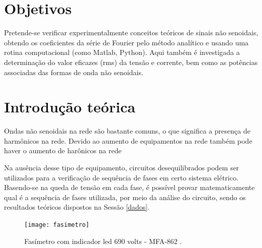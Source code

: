 \documentclass[a4paper,12pt,oneside,openany,table,xcdraw]{article}
\begin{document}
\newcommand{\thedepartment}{Faculdade de Engenharia Elétrica}
\newcommand{\thecourse}{FEELT}
\newcommand{\thetitle}{ANÁLISE DE ONDAS NÃO SENOIDAIS - LÂMPADAS (CARGAS NÃO LINEARES)}
\newcommand{\thetype}{Relatório da Disciplina de Experimental de Circuitos Elétricos II}
\newcommand{\theproftitle}{Bacharel em Engenharia Elétrica}
\newcommand{\thestudent}{Lesly Viviane Montúfar Berrios\\
\centering11811ETE001}
\newcommand{\theadvisor}{Prof. Wellington Maycon Santos Bernardes}
\newcommand{\thecity}{Uberlândia}

\thispagestyle{empty}


\onehalfspacing
\tableofcontents %
\newpage

\section{Objetivos} %
Pretende-se verificar experimentalmente conceitos teóricos de sinais não senoidais, obtendo os coeficientes da série de Fourier pelo método analítico e usando uma rotina computacional (como Matlab, Python). Aqui também é investigada a determinação do valor eficazes (rms) da tensão e corrente, bem como as potências associadas das formas de onda não senoidais.

\section{Introdução teórica} %

Ondas não senoidais na rede são bastante comuns, o que significa a presença de harmônicos na rede. Devido ao aumento de equipamentos na rede também pode haver o aumento de harônicos na rede

Na ausência desse tipo de equipamento, circuitos desequilibrados podem ser utilizados para a verificação de sequência de fases em certo sistema elétrico. Basendo-se na queda de tensão em cada fase, é possível provar matematicamente qual é a sequência de fases utilizada, por meio da análise do circuito, sendo os resultados teóricos dispostos na Sessão \ref{dados}.

\vspace{0.5cm}
\begin{figure}[H]
\centering
\texttt{[image: fasimetro]}
\caption{Fasímetro com indicador led 690 volts - MFA-862 \cite{fig1}.}
\label{intro:fig1}
\end{figure}
\vspace{0.3cm}
\end{document}
